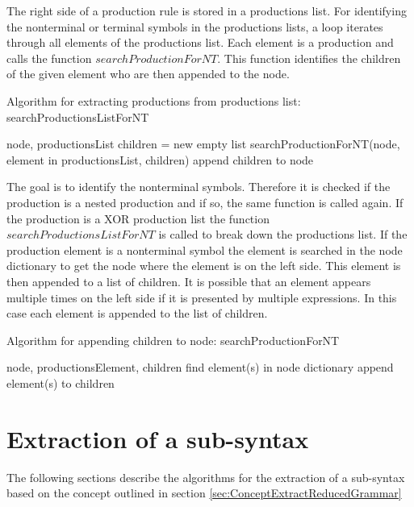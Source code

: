 The right side of a production rule is stored in a productions list. For identifying the nonterminal or terminal symbols in the productions lists, a loop iterates through all elements of the productions list. Each element is a production and calls the function $searchProductionForNT$. This function identifies the children of the given element who are then appended to the node.

\begin{algorithm}[H]
\caption{Algorithm for extracting productions from productions list: searchProductionsListForNT}
\begin{algorithmic}[1] 
\Require node, productionsList
	\State children = new empty list
	\State searchProductionForNT(node, element in productionsList, children)
	\State append children to node
\EndFor
\end{algorithmic}
\end{algorithm}

The goal is to identify the nonterminal symbols. Therefore it is checked if the production is a nested production and if so, the same function is called again. If the production is a XOR production list the function $searchProductionsListForNT$ is called to break down the productions list. If the production element is a nonterminal symbol the element is searched in the node dictionary to get the node where the element is on the left side. This element is then appended to a list of children. It is possible that an element appears multiple times on the left side if it is presented by multiple expressions. In this case each element is appended to the list of children.

\begin{algorithm}[H]
\caption{Algorithm for appending children to node: searchProductionForNT}
\begin{algorithmic}[1] 
\Require node, productionsElement, children
		\State find element(s) in node dictionary
		\State append element(s) to children
	\EndIf
\EndFor
\end{algorithmic}
\end{algorithm}

\section{Extraction of a sub-syntax}\label{sec:ImplementationExtractReducedGrammar}
The following sections describe the algorithms for the extraction of a sub-syntax based on the concept outlined in section \ref{sec:ConceptExtractReducedGrammar}

